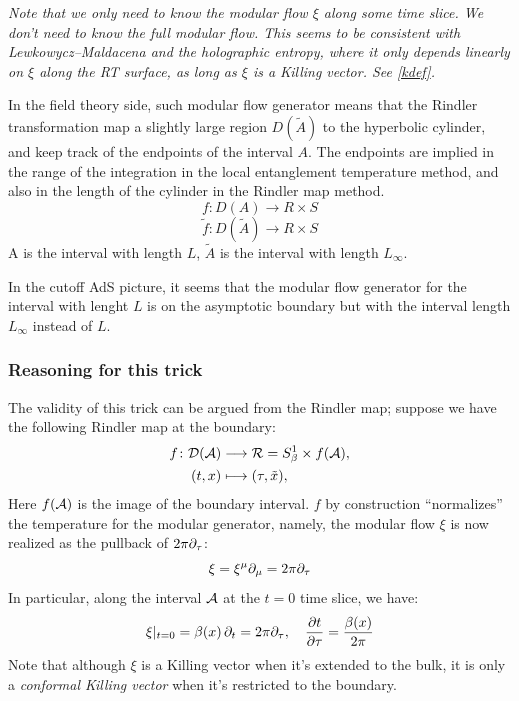 \documentclass[11pt,a4paper]{article}
\begin{document}
	\textit{Note that we only need to know the modular flow $\xi$ along some time slice. We don't need to know the full modular flow. This seems to be consistent with Lewkowycz--Maldacena \cite{Lewkowycz:2013nqa} and the holographic entropy, where it only depends linearly on $\xi$ along the RT surface, as long as $\xi$ is a Killing vector. See \eqref{kdef}. }
	
	In the field theory side, such modular flow generator means that the Rindler transformation map a slightly large region $D(\tilde{A})$ to the hyperbolic cylinder, and keep track of the endpoints of the interval $A$. The endpoints are implied in the range of the integration in the local entanglement temperature method, and also in the length of the cylinder in the Rindler map method.
	\begin{equation}
	f:D(A)\rightarrow R\times S
	\end{equation}
	\begin{equation}
	\tilde{f}:D(\tilde{A})\rightarrow R\times S
	\end{equation}
	A is the interval with length $L$, $\tilde{A}$ is the interval with length $L_\infty$.
	
	In the cutoff AdS picture, it seems that the modular flow generator for the interval with lenght $L$ is on the asymptotic boundary but with the interval length $L_\infty$ instead of $L$.
	
\subsubsection*{Reasoning for this trick}
	The validity of this trick can be argued from the Rindler map; suppose we have the following Rindler map at the boundary:
	\begin{equation}
	\begin{aligned}
		f\colon
		\mathcal{D}(\mathcal{A})
		&\longrightarrow \mathcal{R} = S^1_\beta \times f(\mathcal{A}), \\
		(t,x)
		&\longmapsto (\tau,\tilde{x}),
	\end{aligned}
	\end{equation}
	Here $f(\mathcal{A})$ is the image of the boundary interval. $f$ by construction ``normalizes'' the temperature for the modular generator, namely, the modular flow $\xi$ is now realized as the pullback of $2\pi\partial_{\tau}$:
	\begin{equation}
		\xi = \xi^\mu \partial_{\mu}
		= 2\pi\partial_{\tau}
	\end{equation}
	In particular, along the interval $\mathcal{A}$ at the $t = 0$ time slice, we have:
	\begin{equation}
		\xi|_{t = 0}
		= \beta(x)\,\partial_{t}
		= 2\pi\partial_{\tau},
	\quad
		\pdv{t}{\tau}
		= \frac{\beta(x)}{2\pi}
	\end{equation}
	Note that although $\xi$ is a Killing vector when it's extended to the bulk, it is only a \textit{conformal Killing vector} when it's restricted to the boundary. 
	
\end{document}

